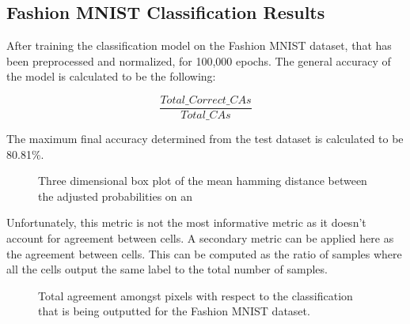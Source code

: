 \documentclass[conference]{IEEEtran}
\begin{document}
\subsection{Fashion MNIST Classification Results}

After training the classification model on the Fashion MNIST dataset, that has been preprocessed and normalized, for 100,000 epochs. The general accuracy of the model is calculated to be the following:

\begin{equation}
    \frac{Total\_Correct\_CAs} {Total\_CAs}
\end{equation}

The maximum final accuracy determined from the test dataset is calculated to be 80.81\%.

\begin{figure}[htbp]
\caption{Three dimensional box plot of the mean hamming distance between the adjusted probabilities on an }
\end{figure}



Unfortunately, this metric is not the most informative metric as it doesn't account for agreement between cells. A secondary metric can be applied here as the agreement between cells. This can be computed as the ratio of samples where all the cells output the same label to the total number of samples.

\begin{figure}[htbp]
\caption{ Total agreement amongst pixels with respect to the classification that is being outputted for the Fashion MNIST dataset.}
\end{figure}
\end{document}
